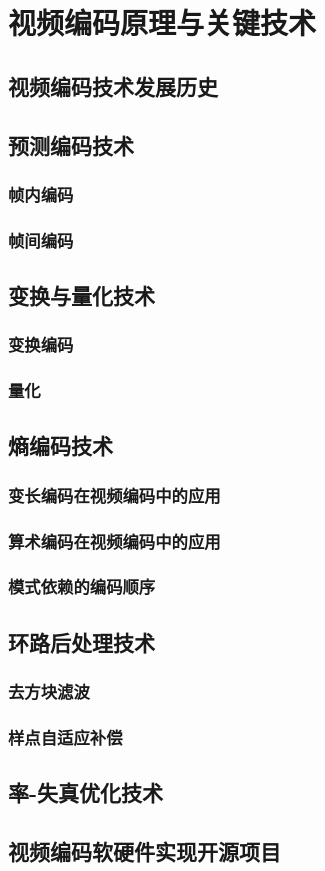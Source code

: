 \chapter{视频编码原理与关键技术}
\label{cha:c2}

\section{视频编码技术发展历史}

\section{预测编码技术}
\subsection{帧内编码}
\subsection{帧间编码}

\section{变换与量化技术}
\subsection{变换编码}
\subsection{量化}

\section{熵编码技术}
\subsection{变长编码在视频编码中的应用}
\subsection{算术编码在视频编码中的应用}
\subsection{模式依赖的编码顺序}

\section{环路后处理技术}
\subsection{去方块滤波}
\subsection{样点自适应补偿}

\section{率-失真优化技术}

\section{视频编码软硬件实现开源项目}